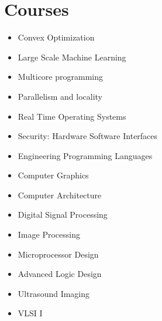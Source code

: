\documentclass[]{friggeri-cv} %
\begin{document}
\section{Courses}
\begin{itemize}
\item Convex Optimization
\item Large Scale Machine Learning
\item Multicore programming
\item Parallelism and locality
\item Real Time Operating Systems
\item Security: Hardware Software Interfaces
\item Engineering Programming Languages
\item Computer Graphics
\item Computer Architecture
\item Digital Signal Processing
\item Image Processing
\item Microprocessor Design
\item Advanced Logic Design
\item Ultrasound Imaging
\item VLSI I
\end{itemize}

%
%
%
%
%
%
%


\end{document}
